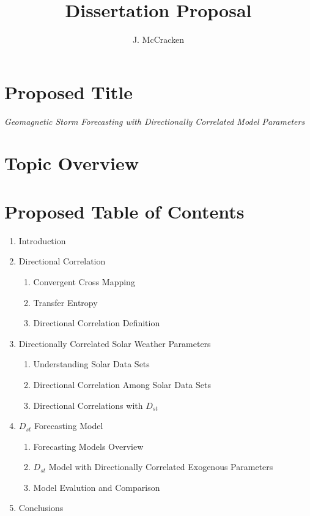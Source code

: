 \documentclass[letter,11pt]{article}
\title{Dissertation Proposal}
\author{J. McCracken}
\begin{document}

\noindent\makebox[\linewidth]{\rule{\paperwidth}{0.4pt}}

\section*{Proposed Title}
{\em Geomagnetic Storm Forecasting with Directionally Correlated Model Parameters}

\section*{Topic Overview}


\section*{Proposed Table of Contents}
\begin{enumerate}
\item Introduction
\item Directional Correlation
\begin{enumerate}
\item Convergent Cross Mapping
\item Transfer Entropy
\item Directional Correlation Definition
\end{enumerate}
\item Directionally Correlated Solar Weather Parameters
\begin{enumerate}
\item Understanding Solar Data Sets
\item Directional Correlation Among Solar Data Sets
\item Directional Correlations with $D_{st}$
\end{enumerate}
\item $D_{st}$ Forecasting Model
\begin{enumerate}
\item Forecasting Models Overview
\item $D_{st}$ Model with Directionally Correlated Exogenous Parameters
\item Model Evalution and Comparison
\end{enumerate}
\item Conclusions
\end{enumerate}
\end{document}
